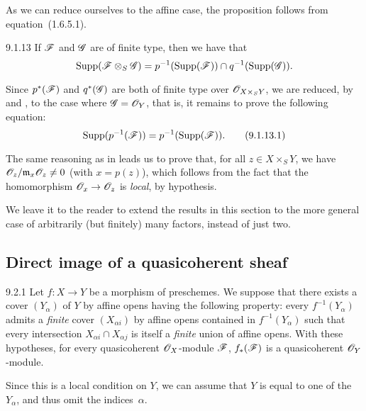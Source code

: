 \documentclass{book}
\begin{document}
As we can reduce ourselves to the affine case, the proposition follows from
equation~(1.6.5.1).

\begin{envs}[Corollary]{9.1.13}
\label{cor-1.9.1.13}
If $\mathscr{F}$ and $\mathscr{G}$ are of finite type, then we have that
\[
  {\mathop{\mathrm{Supp}}\nolimits}(\mathscr{F}\otimes_S\mathscr{G})
  =p^{-1}({\mathop{\mathrm{Supp}}\nolimits}(\mathscr{F}))\cap q^{-1}({\mathop{\mathrm{Supp}}\nolimits}(\mathscr{G})).
\]
\end{envs}

Since $p^\ast(\mathscr{F})$ and $q^\ast(\mathscr{G})$ are both of finite type over
$\mathscr{O}_{X\times_S Y}$, we are reduced, by  and , to
the case where $\mathscr{G}=\mathscr{O}_Y$, that is, it remains to prove the following
equation:
\[
  {\mathop{\mathrm{Supp}}\nolimits}(p^{-1}(\mathscr{F}))=p^{-1}({\mathop{\mathrm{Supp}}\nolimits}(\mathscr{F})).\tag{9.1.13.1}
\]

The same reasoning as in  leads us to prove that, for all
$z\in X\times_S Y$, we have $\mathscr{O}_z/\mathfrak{m}_x\mathscr{O}_z\neq0$ (with $x=p(z)$),
which follows from the fact that the homomorphism $\mathscr{O}_x\to\mathscr{O}_z$ is \emph{local},
by hypothesis.

We leave it to the reader to extend the results in this section to the more
general case of arbitrarily (but finitely) many factors, instead of just two.

\subsection{Direct image of a quasicoherent sheaf}
\label{1-schemes-9.2}        

\begin{envs}[Proposition]{9.2.1}
\label{prop-1.9.2.1}
Let $f\colon X\to Y$ be a morphism of
preschemes.  We suppose that there exists a cover $(Y_\alpha)$ of $Y$ by affine
opens having the following property: every $f^{-1}(Y_\alpha)$ admits a
\emph{finite} cover $(X_{\alpha i})$ by affine opens contained in
$f^{-1}(Y_\alpha)$ such that every intersection $X_{\alpha i}\cap X_{\alpha j}$
is itself a \emph{finite} union of affine opens.  With these hypotheses, for
every quasicoherent $\mathscr{O}_X$-module $\mathscr{F}$, $f_\ast(\mathscr{F})$ is a
quasicoherent $\mathscr{O}_Y$-module.
\end{envs}

Since this is a local condition on $Y$, we can assume that $Y$ is equal to one
of the $Y_\alpha$, and thus omit the indices~$\alpha$.
\end{document}

